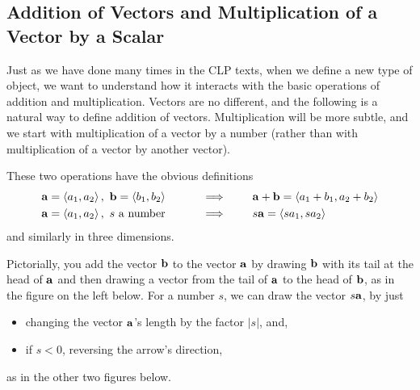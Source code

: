 \subsection{Addition of Vectors and Multiplication of a Vector by a Scalar}

Just as we have done many times in the CLP texts, when we define a new 
type of object, we want to understand how it interacts with the basic 
operations of addition and multiplication. Vectors are no different, and 
the following is a natural way to define addition of vectors.
Multiplication will be more subtle, and we start with multiplication of a vector by a number (rather than with multiplication of a vector by 
another vector).

\begin{defn}
             \label{def:addScalMult}
These two operations have the obvious definitions
\begin{alignat*}{2}
&\mathbf{a}=\left< a_1,a_2\right>,\ \mathbf{b} =\left< b_1,b_2\right>
             \qquad&&\implies\qquad\mathbf{a}+\mathbf{b}=\left< a_1+b_1,a_2+b_2\right>\\
&\mathbf{a}=\left< a_1,a_2\right>,\ s\text{ a number}
            \qquad&&\implies\qquad s\mathbf{a}=\left< sa_1,sa_2\right>
\end{alignat*}
and similarly in three dimensions.
\end{defn} 
Pictorially, you add the vector $\mathbf{b}$ to the vector $\mathbf{a}$ 
by drawing $\mathbf{b}$ with its tail at the head of $\mathbf{a}$ and then drawing
a vector from the tail of $\mathbf{a}$ to the head of $\mathbf{b}$, as in the figure
on the left below. For a number $s$, we can draw the vector $s\mathbf{a}$, by 
just 
\begin{itemize}\itemsep1pt \parskip0pt 
\item
changing the vector $\mathbf{a}$'s length by the factor $|s|$, and,
\item
if $s<0$, reversing the arrow's direction, 
\end{itemize}
as in the other two figures below.
